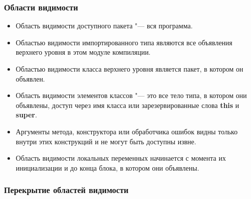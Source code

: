 \documentclass[default]{beamer}
\begin{document}
	\begin{frame}
		\frametitle{Области видимости}
		
		\begin{itemize}
			\item Область видимости доступного пакета "--- вся программа.
			\item Областью видимости импортированного типа являются все объявления верхнего уровня в этом модуле компиляции.
			\item Областью видимости класса верхнего уровня является пакет, в котором он объявлен.
			\item Область видимости элементов классов "--- это все тело типа, в котором они объявлены, доступ через имя класса или зарезервированные слова \textbf{this} и \textbf{super}.
			\item Аргументы метода, конструктора или обработчика ошибок видны только внутри этих конструкций и не могут быть доступны извне.
			\item Область видимости локальных переменных начинается с момента их инициализации и до конца блока, в котором они объявлены.
		\end{itemize}
	\end{frame}

	\begin{frame}
		\frametitle{Перекрытие областей видимости}
		
		\begin{overlayarea}{\textwidth}{0.5\textheight}
			\begin{itemize}
			\end{itemize}
		\end{overlayarea}

	\end{frame}
\end{document}
